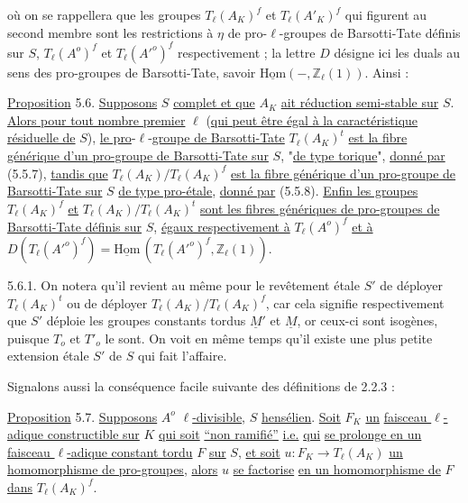 
où on se rappellera que les groupes $T_\ell(A_K)^f$ et $T_\ell(A'_K)^f$ qui figurent au second membre sont les restrictions à $\eta$ de pro-$\ell$-groupes de Barsotti-Tate définis sur $S$, $T_\ell(A^o)^f$ et $T_\ell({A'}^o)^f$ respectivement ; la lettre $D$ désigne ici les duals au sens des pro-groupes de Barsotti-Tate, savoir $\underline{\mathrm{Hom}}( - , \mathbb{Z}_\ell(1))$. Ainsi :

\underline{Proposition} 5.6. \underline{Supposons} $S$ \underline{complet et que} $A_K$ \underline{ait réduction semi-stable sur} $S$. \underline{Alors pour tout nombre premier} $\ell$ (\underline{qui peut être égal à la caractéristique résiduelle de} $S$), \underline{le pro}-$\ell$-\underline{groupe de Barsotti-Tate} $T_\ell(A_K)^t$ \underline{est la fibre générique d'un pro-groupe de Barsotti-Tate sur} $S$, "\underline{de type torique}", \underline{donné par} (5.5.7), \underline{tandis que} $T_\ell(A_K)/T_\ell(A_K)^f$ \underline{est la fibre générique d'un pro-groupe de Barsotti-Tate sur} $S$ \underline{de type pro-étale}, \underline{donné par} (5.5.8). \underline{Enfin les groupes} $T_\ell(A_K)^f$ \underline{et} $T_\ell(A_K)/T_\ell(A_K)^t$ \underline{sont les fibres génériques de pro-groupes de Barsotti-Tate définis sur} $S$, \underline{égaux respectivement à} $T_\ell(A^o)^f$ \underline{et à} $D(T_\ell({A'}^o)^f) = \underline{\mathrm{Hom}}\,(T_\ell({A'}^o)^f, \mathbb{Z}_\ell(1))$.

5.6.1. On notera qu'il revient au même pour le revêtement étale $S'$ de déployer $T_\ell(A_K)^t$ ou de déployer $T_\ell(A_K)/T_\ell(A_K)^f$, car cela signifie respectivement que $S'$ déploie les groupes constants tordus $\underline{M}'$ et $\underline{M}$, or ceux-ci sont isogènes, puisque $T_o$ et $T'_o$ le sont. On voit en même temps qu'il existe une plus petite extension étale $S'$ de $S$ qui fait l'affaire.

Signalons aussi la conséquence facile suivante des définitions de 2.2.3 :



\underline{Proposition} 5.7.  \underline{Supposons} $A^o$ \underline{$\ell$-divisible}, $S$ \underline{hensélien}. \underline{Soit} $F_K$ \underline{un} \underline{faisceau $\ell$-adique constructible sur} $K$ \underline{qui soit} \underline{``non ramifié''} \underline{i.e.} \underline{qui} \underline{se prolonge en un faisceau $\ell$-adique constant tordu} $F$ \underline{sur} $S$, \underline{et soit} $u: F_K \longrightarrow T_\ell(A_K)$ \underline{un homomorphisme de pro-groupes}, \underline{alors} $u$ \underline{se factorise} \underline{en un homomorphisme de} $F$ \underline{dans} $T_\ell(A_K)^f$.

